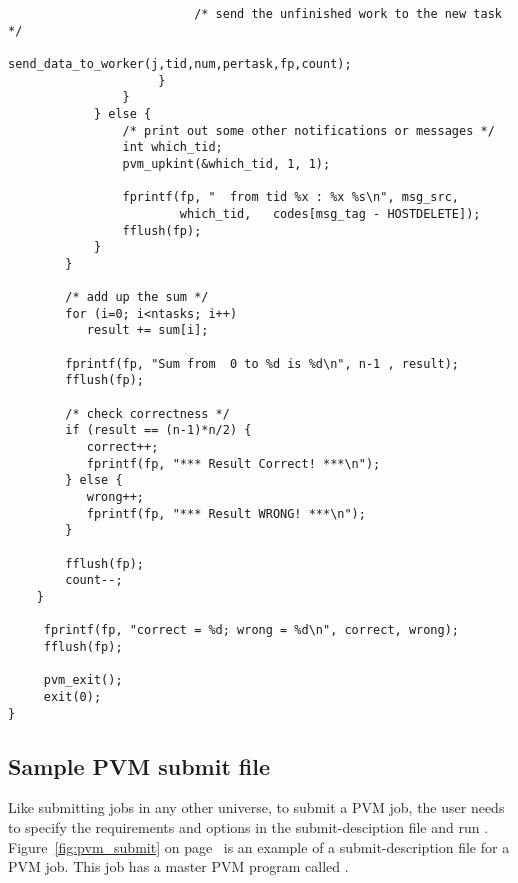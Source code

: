 \begin{verbatim}
                          /* send the unfinished work to the new task */
                          send_data_to_worker(j,tid,num,pertask,fp,count);
                     }
                }
            } else {
                /* print out some other notifications or messages */
                int which_tid;
                pvm_upkint(&which_tid, 1, 1);
        
                fprintf(fp, "  from tid %x : %x %s\n", msg_src,
                        which_tid,   codes[msg_tag - HOSTDELETE]);
                fflush(fp);
            }
        }        
      
        /* add up the sum */
        for (i=0; i<ntasks; i++)
           result += sum[i];
          
        fprintf(fp, "Sum from  0 to %d is %d\n", n-1 , result);
        fflush(fp);
          
        /* check correctness */
        if (result == (n-1)*n/2) {
           correct++;
           fprintf(fp, "*** Result Correct! ***\n");
        } else {
           wrong++;
           fprintf(fp, "*** Result WRONG! ***\n");
        }

        fflush(fp);
        count--;
    }
     
     fprintf(fp, "correct = %d; wrong = %d\n", correct, wrong);
     fflush(fp);

     pvm_exit();
     exit(0);
}

\end{verbatim}
\normalsize

\subsection{\label{sec:PVM-Submit}Sample PVM submit file}

Like submitting jobs in any other universe,
to submit a PVM job, the user needs to specify the requirements and
options in the submit-desciption file and run .
Figure~\ref{fig:pvm_submit} on page~\pageref{fig:pvm_submit} is an
example of a submit-description file for a PVM job.  
This job has a master PVM program called .

